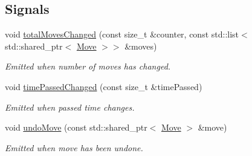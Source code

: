 \subsection*{Signals}
\begin{DoxyCompactItemize}
\item 
void \mbox{\hyperlink{class_move_stack_model_a8b596d9619735fc7d066a3d0e1b8cc55}{total\+Moves\+Changed}} (const size\+\_\+t \&counter, const std\+::list$<$ std\+::shared\+\_\+ptr$<$ \mbox{\hyperlink{struct_move}{Move}} $>$$>$ \&moves)
\begin{DoxyCompactList}\small\item\em Emitted when number of moves has changed. \end{DoxyCompactList}\item 
void \mbox{\hyperlink{class_move_stack_model_aa7d3186093032e523b2a7bbefa74f8fb}{time\+Passed\+Changed}} (const size\+\_\+t \&time\+Passed)
\begin{DoxyCompactList}\small\item\em Emitted when passed time changes. \end{DoxyCompactList}\item 
void \mbox{\hyperlink{class_move_stack_model_a16436cf5acda5455355c24f28586f1e8}{undo\+Move}} (const std\+::shared\+\_\+ptr$<$ \mbox{\hyperlink{struct_move}{Move}} $>$ \&move)
\begin{DoxyCompactList}\small\item\em Emitted when move has been undone. \end{DoxyCompactList}\end{DoxyCompactItemize}
